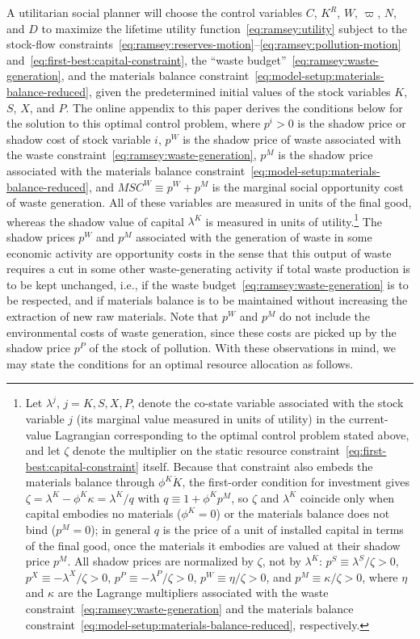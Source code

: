 A utilitarian social planner will choose the control variables $C$, $K^R$, $W$, $\varpi$, $N$, and $D$ to maximize the lifetime utility function~\eqref{eq:ramsey:utility} subject to the stock-flow constraints~\eqref{eq:ramsey:reserves-motion}--\eqref{eq:ramsey:pollution-motion} and~\eqref{eq:first-best:capital-constraint}, the ``waste budget''~\eqref{eq:ramsey:waste-generation}, and the materials balance constraint~\eqref{eq:model-setup:materials-balance-reduced}, given the predetermined initial values of the stock variables $K$, $S$, $X$, and $P$. The online appendix to this paper derives the conditions below for the solution to this optimal control problem, where $p^i > 0$ is the shadow price or shadow cost of stock variable $i$, $p^W$ is the shadow price of waste associated with the waste constraint~\eqref{eq:ramsey:waste-generation}, $p^M$ is the shadow price associated with the materials balance constraint~\eqref{eq:model-setup:materials-balance-reduced}, and $MSC^W \equiv p^W + p^M$ is the marginal social opportunity cost of waste generation. All of these variables are measured in units of the final good, whereas the shadow value of capital $\lambda^K$ is measured in units of utility.\footnote{Let $\lambda^j$, $j=K,S,X,P$, denote the co-state variable associated with the stock variable $j$ (its marginal value measured in units of utility) in the current-value Lagrangian corresponding to the optimal control problem stated above, and let $\zeta$ denote the multiplier on the static resource constraint~\eqref{eq:first-best:capital-constraint} itself. Because that constraint also embeds the materials balance through $\phi^K\dot K$, the first-order condition for investment gives $\zeta=\lambda^K-\phi^K\kappa=\lambda^K/q$ with $q\equiv1+\phi^Kp^M$, so $\zeta$ and $\lambda^K$ coincide only when capital embodies no materials ($\phi^K=0$) or the materials balance does not bind ($p^M=0$); in general $q$ is the price of a unit of installed capital in terms of the final good, once the materials it embodies are valued at their shadow price $p^M$. All shadow prices are normalized by $\zeta$, not by $\lambda^K$: $p^S \equiv \lambda^S/\zeta > 0$, $p^X \equiv -\lambda^X/\zeta > 0$, $p^P \equiv -\lambda^P/\zeta > 0$, $p^W \equiv \eta/\zeta > 0$, and $p^M \equiv \kappa/\zeta > 0$, where $\eta$ and $\kappa$ are the Lagrange multipliers associated with the waste constraint~\eqref{eq:ramsey:waste-generation} and the materials balance constraint~\eqref{eq:model-setup:materials-balance-reduced}, respectively.} The shadow prices $p^W$ and $p^M$ associated with the generation of waste in some economic activity are opportunity costs in the sense that this output of waste requires a cut in some other waste-generating activity if total waste production is to be kept unchanged, i.e., if the waste budget~\eqref{eq:ramsey:waste-generation} is to be respected, and if materials balance is to be maintained without increasing the extraction of new raw materials. Note that $p^W$ and $p^M$ do not include the environmental costs of waste generation, since these costs are picked up by the shadow price $p^P$ of the stock of pollution. With these observations in mind, we may state the conditions for an optimal resource allocation as follows.


